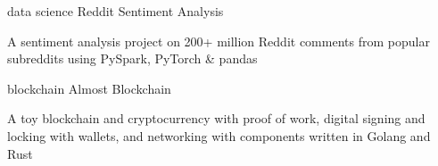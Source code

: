 
\begin{cventries}
  \cventry
    {data science} %
    {Reddit Sentiment Analysis} %
    {~} %
    {} %
    {
      \begin{cvitems} %
        \item {A sentiment analysis project on 200+ million Reddit comments from popular subreddits using PySpark, PyTorch \& pandas}
      \end{cvitems}
    }

  \cventry
    {blockchain} %
    {Almost Blockchain} %
    {} %
    {} %
    {
      \begin{cvitems} %
      	\item {A toy blockchain and cryptocurrency with proof of work, digital signing and locking with wallets, and networking with components written in Golang and Rust}
      \end{cvitems}
    }
\end{cventries}
